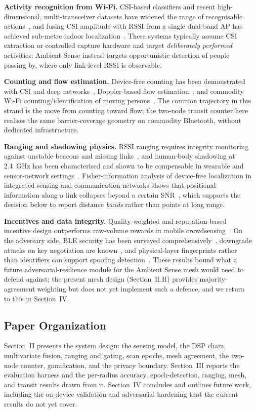 \documentclass[journal,10pt]{IEEEtran}
\begin{document}
\textbf{Activity recognition from Wi-Fi.} CSI-based classifiers and recent
high-dimensional, multi-transceiver datasets have widened the range of
recognisable actions~\cite{wong2024}, and fusing CSI amplitude with RSSI from
a single dual-band AP has achieved sub-metre indoor
localization~\cite{sanchez2020}. These systems typically assume CSI
extraction or controlled capture hardware and target \emph{deliberately
performed} activities; Ambient Sense instead targets opportunistic detection
of people passing by, where only link-level RSSI is observable.

\textbf{Counting and flow estimation.} Device-free counting has been
demonstrated with CSI and deep networks~\cite{khan2023}, Doppler-based flow
estimation~\cite{zhou2020}, and commodity Wi-Fi counting/identification of
moving persons~\cite{dmip2023}. The common trajectory in this strand is the
move from counting toward flow; the two-node transit counter here realises
the same barrier-coverage geometry on commodity Bluetooth, without dedicated
infrastructure.

\textbf{Ranging and shadowing physics.} RSSI ranging requires integrity
monitoring against unstable beacons and missing
links~\cite{ramirez2021,bai2020}, and human-body shadowing at 2.4~GHz has
been characterised and shown to be compensable in wearable and
sensor-network settings~\cite{januszkiewicz2018}. Fisher-information analysis
of device-free localization in integrated sensing-and-communication networks
shows that positional information along a link collapses beyond a certain
SNR~\cite{li2024}, which supports the decision below to report distance
\emph{bands} rather than points at long range.

\textbf{Incentives and data integrity.} Quality-weighted and reputation-based
incentive design outperforms raw-volume rewards in mobile
crowdsensing~\cite{zhang2022,wang2018}. On the adversary side, BLE security
has been surveyed comprehensively~\cite{casar2022}, downgrade attacks on key
negotiation are known~\cite{antonioli2020}, and physical-layer fingerprints
rather than identifiers can support spoofing
detection~\cite{cai2024,mobisys2024,hensler2019}. These results bound what a
future adversarial-resilience module for the Ambient Sense mesh would need
to defend against; the present mesh design (Section~II.H) provides
majority-agreement weighting but does not yet implement such a defence, and
we return to this in Section~IV.

\subsection{Paper Organization}
Section~II presents the system design: the sensing model, the DSP chain,
multivariate fusion, ranging and gating, scan epochs, mesh agreement, the
two-node counter, gamification, and the privacy boundary. Section~III
reports the evaluation harness and the per-radius accuracy, epoch-detection,
ranging, mesh, and transit results drawn from it. Section~IV concludes and
outlines future work, including the on-device validation and adversarial
hardening that the current results do not yet cover.
\end{document}
